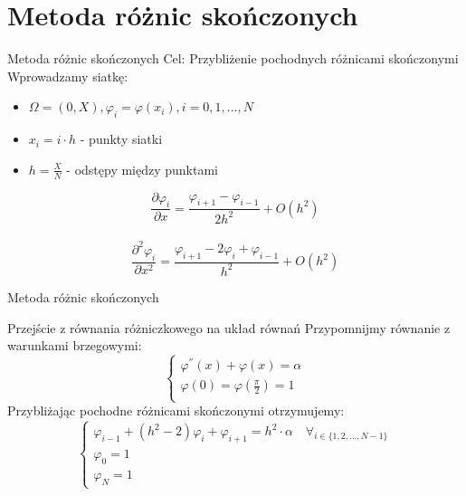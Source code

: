 \section{Metoda różnic skończonych}

	\begin{frame}{Metoda różnic skończonych}
		Cel: Przybliżenie pochodnych różnicami skończonymi
		Wprowadzamy siatkę:
		\begin{itemize}
			\item $\Omega = (0, X), \varphi_i = \varphi(x_i), i = 0,1,...,N$
			\item $x_i = i \cdot h$ - punkty siatki					
			\item $h = \frac{X}{N}$ - odstępy między punktami		
		\end{itemize}

		$$\frac{\partial \varphi_i}{\partial x} = \frac{\varphi_{i+1} - \varphi_{i-1}}{2h^2} + O(h^2)$$ \\
		$$\frac{\partial^2 \varphi_i}{\partial x^2} = \frac{\varphi_{i+1} - 2 \varphi_i + \varphi_{i-1}}{h^2} + O(h^2)$$
	\end{frame}
\begin{frame}{Metoda różnic skończonych}
		\begin{exampleblock}{Przejście z równania różniczkowego na układ równań}
		Przypomnijmy równanie z warunkami brzegowymi:
		$$
		\begin{cases}
		\varphi^{''}(x) + \varphi(x) = \alpha \\
		\varphi(0) = \varphi(\frac{\pi}{2}) = 1 \\
		\end{cases}
		$$
		Przybliżając pochodne różnicami skończonymi otrzymujemy:
		$$
		\begin{cases}
		\varphi_{i-1} + (h^2 - 2)\varphi_i + \varphi_{i+1} = h^2 \cdot \alpha \quad \forall_{i \in \{1,2, ..., N-1\}} \\
		\varphi_0 = 1 \\
		\varphi_N = 1
		\end{cases}
		$$
	\end{exampleblock}	
\end{frame}


